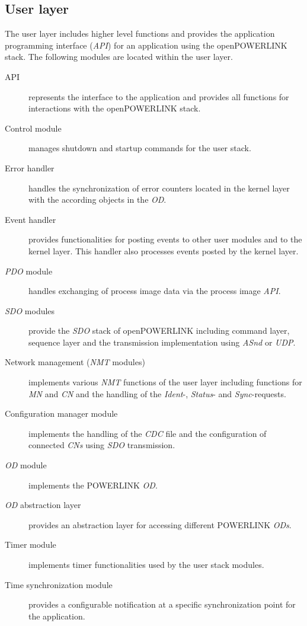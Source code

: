 \subsection{User layer}
\label{sec:oplk_architecture_user}

The user layer includes higher level functions and provides the application programming interface (\emph{API}) for an application using the openPOWERLINK stack.
The following modules are located within the user layer. \cite[openPOWERLINK User Layer]{openpowerlink_doc}

\begin{description}
    \item[API] represents the interface to the application and provides all functions for interactions with the openPOWERLINK stack.
    \item[Control module] manages shutdown and startup commands for the user stack.
    \item[Error handler] handles the synchronization of error counters located in the kernel layer with the according objects in the \emph{OD}.
    \item[Event handler] provides functionalities for posting events to other user modules and to the kernel layer.
    This handler also processes events posted by the kernel layer.
    \item[\emph{PDO} module] handles exchanging of process image data via the process image \emph{API}.
    \item[\emph{SDO} modules] provide the \emph{SDO} stack of openPOWERLINK including command layer, sequence layer and the transmission implementation using \emph{ASnd} or \emph{UDP}.
    \item[Network management (\emph{NMT} modules)] implements various \emph{NMT} functions of the user layer including functions for \emph{MN} and \emph{CN} and the handling of the \emph{Ident}-, \emph{Status}- and \emph{Sync}-requests.
    \item[Configuration manager module] implements the handling of the \emph{CDC} file and the configuration of connected \emph{CNs} using \emph{SDO} transmission.
    \item[\emph{OD} module] implements the POWERLINK \emph{OD}.
    \item[\emph{OD} abstraction layer] provides an abstraction layer for accessing different POWERLINK \emph{ODs}.
    \item[Timer module] implements timer functionalities used by the user stack modules.
    \item[Time synchronization module] provides a configurable notification at a specific synchronization point for the application.
\end{description}


